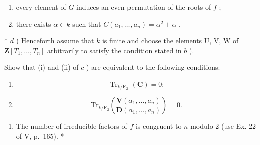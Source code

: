 \begin{enumerate}
\def\labelenumi{(\roman{enumi})}
\item
  every element of \(G\) induces an even permutation of the roots of \(f\) ;
\item
  there exists \(\alpha \in k\) such that \(C(a_{1},\ldots ,a_{n}) = \alpha^{2} + \alpha\) .
\end{enumerate}

* \(d\) ) Henceforth assume that \(k\) is finite and choose the elements U, V, W of \(\mathbf{Z}[T_1, \ldots, T_n]\) arbitrarily to satisfy the condition stated in \(b\) ).

Show that (i) and (ii) of \(c\) ) are equivalent to the following conditions:

\begin{enumerate}
\def\labelenumi{(\roman{enumi})}
\setcounter{enumi}{2}
\tightlist
\item
  \[
\operatorname{Tr} _ {k / \mathbf {F} _ {2}} (\mathbf {C}) = 0;
\]
\item
  \[
\mathrm{Tr} _ {k / \mathbf {F} _ {2}} \left(\frac {\mathbf {V} (a _ {1} , \dots , a _ {n})}{\mathbf {D} (a _ {1} , \dots , a _ {n})}\right) = 0.
\]
\end{enumerate}

\begin{enumerate}
\def\labelenumi{(\alph{enumi})}
\setcounter{enumi}{21}
\tightlist
\item
  The number of irreducible factors of \(f\) is congruent to \(n\) modulo 2 (use Ex. 22 of V, p.~165). *
\end{enumerate}

